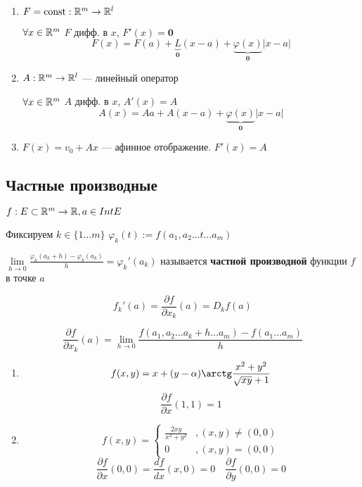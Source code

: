 \begin{example}
    \begin{enumerate}
        \item $F=\text{const} : \mathbb{R}^m\to\mathbb{R}^l$
        
        $\forall x\in\mathbb{R}^m$ $F$ дифф. в $x$, $F'(x)=\mathbf 0$
        $$F(x)=F(a) + \underbrace{L}_{\mathbf 0}(x-a) + \underbrace{\varphi(x)}_{\mathbf 0}|x-a|$$

        \item $A : \mathbb{R}^m \to \mathbb{R}^l$ --- линейный оператор
        
        $\forall x\in\mathbb{R}^m$ $A$ дифф. в $x$, $A'(x)=A$
        $$A(x)=Aa+A(x-a)+\underbrace{\varphi(x)}_{\mathbf 0}|x-a|$$

        \item $F(x)=v_0+Ax$ --- афинное отображение. $F'(x)=A$
    \end{enumerate}
\end{example}

\subsection{Частные производные}

$f:E\subset \mathbb{R}^m \to \mathbb{R}, a\in Int E$

Фиксируем $k\in\{1\ldots m\}$ $\varphi_k(t):=f(a_1,a_2\ldots t\ldots a_m)$

$\lim\limits_{h\to0}\frac{\varphi_k(a_k+h)-\varphi_k(a_k)}{h} = \varphi_k'(a_k)$ называется \textbf{частной производной} функции $f$ в точке $a$

$$f_k'(a)=\frac{\partial f}{\partial x_k}(a)=D_k f(a)$$

$$\frac{\partial f}{\partial x_k}(a) = \lim_{h\to0}\frac{f(a_1,a_2\ldots a_{k}+h\ldots a_m)-f(a_1\ldots a_m)}{h}$$

\begin{example}
    \begin{enumerate}
        \item $$f(x,y)=x+(y-\alpha)\arctg\frac{x^2+y^2}{\sqrt{xy}+1}$$
        $$\frac{\partial f}{\partial x}(1,1)=1$$
        \item $$f(x,y)=\begin{cases}
            \frac{2xy}{x^2+y^2} &, (x,y)\not=(0,0) \\
            0 &, (x,y)=(0,0)
        \end{cases}$$
        $$\frac{\partial f}{\partial x}(0,0)=\frac{df}{dx}(x,0)=0 \quad \frac{\partial f}{\partial y}(0,0)=0$$
    \end{enumerate}
\end{example}

